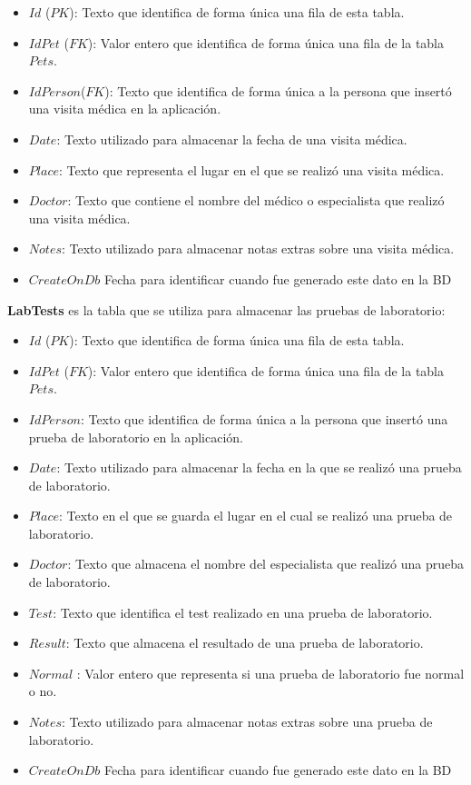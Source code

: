 \begin{itemize}
	\item	$Id$ ($PK$): Texto que identifica de forma única una fila de esta tabla.
	\item	$IdPet$ ($FK$): Valor entero que identifica de forma única una fila de la tabla $Pets$.
	\item	$IdPerson$($FK$): Texto que identifica de forma única a la persona que insertó una visita médica en la aplicación.
	\item	$Date$: Texto utilizado para almacenar la fecha de una visita médica.
	\item	$Place$: Texto que representa el lugar en el que se realizó una visita médica.
	\item	$Doctor$: Texto que contiene el nombre del médico o especialista que realizó una visita médica.
	\item	$Notes$: Texto utilizado para almacenar notas extras sobre una visita médica.
	\item	$CreateOnDb$ 
	Fecha para identificar cuando fue generado este dato en la BD
\end{itemize}

\textbf{LabTests} es la tabla que se utiliza para almacenar las pruebas de laboratorio:

\begin{itemize}
	\item	$Id$ ($PK$): Texto que identifica de forma única una fila de esta tabla.
	\item	$IdPet$ ($FK$): Valor entero que identifica de forma única una fila de la tabla $Pets$.
	\item	$IdPerson$: Texto que identifica de forma única a la persona que insertó una prueba de laboratorio en la aplicación.
	\item	$Date$: Texto utilizado para almacenar la fecha en la que se realizó una prueba de laboratorio.
	\item	$Place$: Texto en el que se guarda el lugar en el cual se realizó una prueba de laboratorio.
	\item	$Doctor$: Texto que almacena el nombre del especialista que realizó una prueba de laboratorio.
	\item	$Test$: Texto que identifica el test realizado en una prueba de laboratorio.
	\item	$Result$: Texto que almacena el resultado de una prueba de laboratorio.
	\item	$Normal$ : Valor entero que representa si una prueba de laboratorio fue normal o no.
	\item	$Notes$: Texto utilizado para almacenar notas extras sobre una prueba de laboratorio.
	\item	$CreateOnDb$ 
Fecha para identificar cuando fue generado este dato en la BD
\end{itemize}

